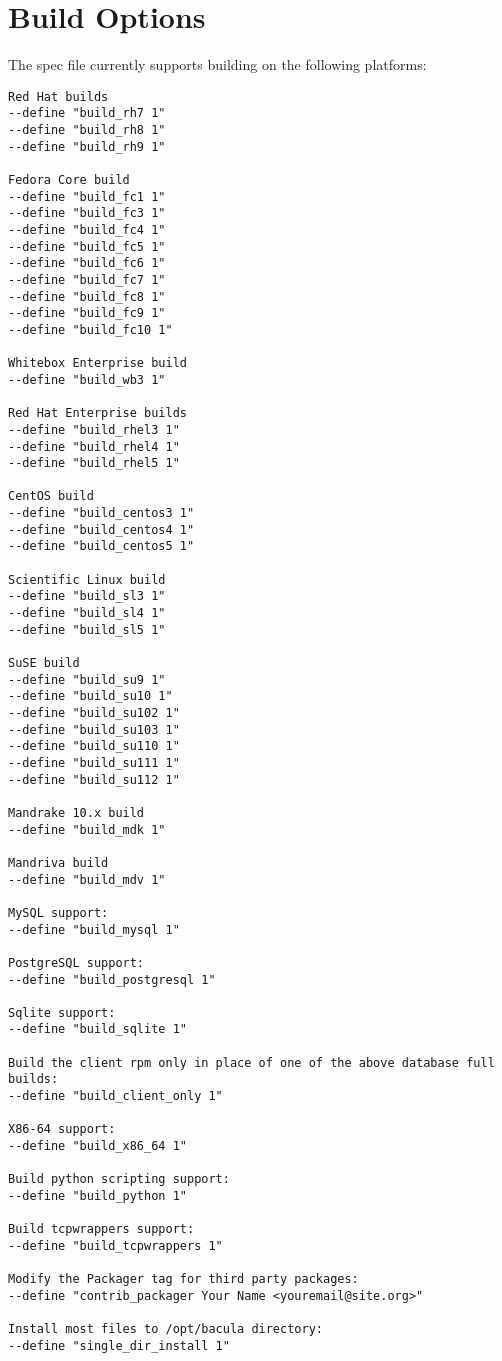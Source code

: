 \section{Build Options}
The spec file currently supports building on the following platforms:
\footnotesize
\begin{verbatim}
Red Hat builds
--define "build_rh7 1"
--define "build_rh8 1"
--define "build_rh9 1"

Fedora Core build
--define "build_fc1 1"
--define "build_fc3 1"
--define "build_fc4 1"
--define "build_fc5 1"
--define "build_fc6 1"
--define "build_fc7 1"
--define "build_fc8 1"
--define "build_fc9 1"
--define "build_fc10 1"

Whitebox Enterprise build
--define "build_wb3 1"

Red Hat Enterprise builds
--define "build_rhel3 1"
--define "build_rhel4 1"
--define "build_rhel5 1"

CentOS build
--define "build_centos3 1"
--define "build_centos4 1"
--define "build_centos5 1"

Scientific Linux build
--define "build_sl3 1"
--define "build_sl4 1"
--define "build_sl5 1"

SuSE build
--define "build_su9 1"
--define "build_su10 1"
--define "build_su102 1"
--define "build_su103 1"
--define "build_su110 1"
--define "build_su111 1"
--define "build_su112 1"

Mandrake 10.x build
--define "build_mdk 1"

Mandriva build
--define "build_mdv 1"

MySQL support:
--define "build_mysql 1"

PostgreSQL support:
--define "build_postgresql 1"

Sqlite support:
--define "build_sqlite 1"

Build the client rpm only in place of one of the above database full builds:
--define "build_client_only 1"

X86-64 support:
--define "build_x86_64 1"

Build python scripting support:
--define "build_python 1"

Build tcpwrappers support:
--define "build_tcpwrappers 1"

Modify the Packager tag for third party packages:
--define "contrib_packager Your Name <youremail@site.org>"

Install most files to /opt/bacula directory:
--define "single_dir_install 1"

\end{verbatim}
\normalsize

